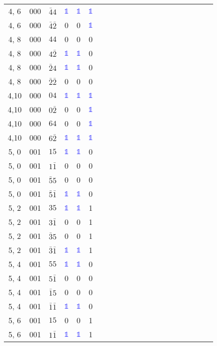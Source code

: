 \begin{longtable*}{c| cccccccccccccccccccc }
4, 6& 000& $\bar{4}4$& \textcolor{blue}{$\mathds{1}$}& \textcolor{blue}{$\mathds{1}$}& \textcolor{blue}{$\mathds{1}$}\\
4, 6& 000& $\bar{4}\bar{2}$& 0& 0& \textcolor{blue}{$\mathds{1}$}\\
4, 8& 000& $44$& 0& 0& 0\\
4, 8& 000& $4\bar{2}$& \textcolor{blue}{$\mathds{1}$}& \textcolor{blue}{$\mathds{1}$}& 0\\
4, 8& 000& $\bar{2}4$& \textcolor{blue}{$\mathds{1}$}& \textcolor{blue}{$\mathds{1}$}& 0\\
4, 8& 000& $\bar{2}\bar{2}$& 0& 0& 0\\
4,10& 000& $04$& \textcolor{blue}{$\mathds{1}$}& \textcolor{blue}{$\mathds{1}$}& \textcolor{blue}{$\mathds{1}$}\\
4,10& 000& $0\bar{2}$& 0& 0& \textcolor{blue}{$\mathds{1}$}\\
4,10& 000& $64$& 0& 0& \textcolor{blue}{$\mathds{1}$}\\
4,10& 000& $6\bar{2}$& \textcolor{blue}{$\mathds{1}$}& \textcolor{blue}{$\mathds{1}$}& \textcolor{blue}{$\mathds{1}$}\\
5, 0& 001& $15$& \textcolor{blue}{$\mathds{1}$}& \textcolor{blue}{$\mathds{1}$}& 0\\
5, 0& 001& $1\bar{1}$& 0& 0& 0\\
5, 0& 001& $\bar{5}5$& 0& 0& 0\\
5, 0& 001& $\bar{5}\bar{1}$& \textcolor{blue}{$\mathds{1}$}& \textcolor{blue}{$\mathds{1}$}& 0\\
5, 2& 001& $35$& \textcolor{blue}{$\mathds{1}$}& \textcolor{blue}{$\mathds{1}$}& 1\\
5, 2& 001& $3\bar{1}$& 0& 0& 1\\
5, 2& 001& $\bar{3}5$& 0& 0& 1\\
5, 2& 001& $\bar{3}\bar{1}$& \textcolor{blue}{$\mathds{1}$}& \textcolor{blue}{$\mathds{1}$}& 1\\
5, 4& 001& $55$& \textcolor{blue}{$\mathds{1}$}& \textcolor{blue}{$\mathds{1}$}& 0\\
5, 4& 001& $5\bar{1}$& 0& 0& 0\\
5, 4& 001& $\bar{1}5$& 0& 0& 0\\
5, 4& 001& $\bar{1}\bar{1}$& \textcolor{blue}{$\mathds{1}$}& \textcolor{blue}{$\mathds{1}$}& 0\\
5, 6& 001& $15$& 0& 0& 1\\
5, 6& 001& $1\bar{1}$& \textcolor{blue}{$\mathds{1}$}& \textcolor{blue}{$\mathds{1}$}& 1\\

\end{longtable*}
